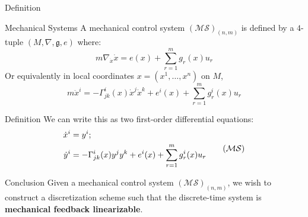 \documentclass{beamer}
\begin{document}
\begin{frame}{Definition}
  \begin{block}{Mechanical Systems}
    A mechanical control system $(\mathcal{MS})_{(n,m)}$ is defined by a $4$-tuple $(M, \nabla, \mathfrak{g}, e)$ where:
    \begin{equation}
      \label{eq:mech}
      m\nabla_{\dot{x}} \dot{x} = e(x) + \sum_{r=1}^m g_r(x) u_r 
  \end{equation}
  Or equivalently in local coordinates $x = (x^1, \dots, x^n)$ on $M$, 
  \begin{equation}\label{SODE-initial}
      m\ddot{x}^i = - \Gamma ^i_{jk}(x)\dot{x}^j \dot{x}^k + e^i(x) + \sum_{r=1}^m g^i_r(x)u_r
  \end{equation}
    
  \end{block}
\end{frame}

\begin{frame}{Definition}
  We can write this as two first-order differential equations:
  \begin{equation}\label{SODE-nonlinear}
      \begin{split}
          \dot{x}^i  &= y^i; \\
          \dot{y}^i  &= - \Gamma^i_{jk}(x)y^jy^k + e^i(x) + \sum_{r=1}^m g_r^i(x)u_r
      \end{split} \tag{$\mathcal{MS}$} 
  \end{equation}

  \begin{block}{Conclusion}
    Given a mechanical control system $(\mathcal{MS})_{(n,m)}$, we wish to construct a discretization scheme such that the discrete-time system is \textbf{mechanical feedback linearizable}.
  \end{block}
  
\end{frame}


\end{document}
